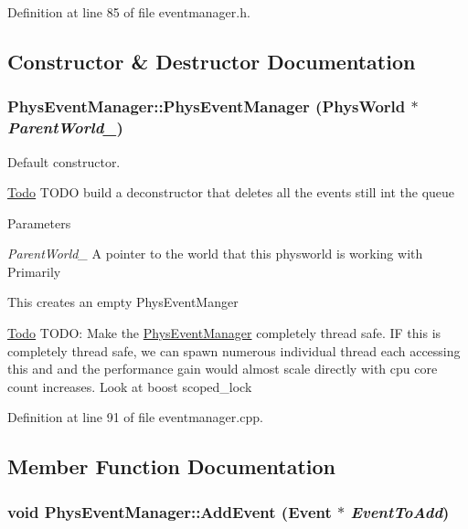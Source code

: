 Definition at line 85 of file eventmanager.h.



\subsection{Constructor \& Destructor Documentation}
\hypertarget{classPhysEventManager_a1355f36d99de303cec6f3b27cadaa9ff}{
\subsubsection[{PhysEventManager}]{\setlength{\rightskip}{0pt plus 5cm}PhysEventManager::PhysEventManager ({\bf PhysWorld} $\ast$ {\em ParentWorld\_\-})}}
\label{d5/dd7/classPhysEventManager_a1355f36d99de303cec6f3b27cadaa9ff}


Default constructor. 

\begin{Desc}
\item[\hyperlink{todo__todo000003}{Todo}]TODO build a deconstructor that deletes all the events still int the queue \end{Desc}

\begin{DoxyParams}{Parameters}
\item[{\em ParentWorld\_\-}]A pointer to the world that this physworld is working with Primarily\end{DoxyParams}
This creates an empty PhysEventManger

\begin{Desc}
\item[\hyperlink{todo__todo000002}{Todo}]TODO: Make the \hyperlink{classPhysEventManager}{PhysEventManager} completely thread safe. IF this is completely thread safe, we can spawn numerous individual thread each accessing this and and the performance gain would almost scale directly with cpu core count increases. Look at boost scoped\_\-lock \end{Desc}


Definition at line 91 of file eventmanager.cpp.



\subsection{Member Function Documentation}
\hypertarget{classPhysEventManager_a6f51657b66d214942aed0e832ee558ef}{
\subsubsection[{AddEvent}]{\setlength{\rightskip}{0pt plus 5cm}void PhysEventManager::AddEvent ({\bf Event} $\ast$ {\em EventToAdd})}}
\label{d5/dd7/classPhysEventManager_a6f51657b66d214942aed0e832ee558ef}


